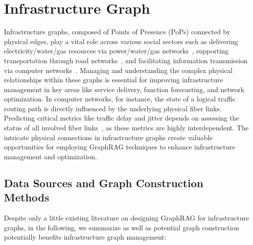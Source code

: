 \newpage
\section{Infrastructure Graph \emojiinfratitle}\label{sec-infra}


Infrastructure graphs, composed of Points of Presence (PoPs) connected by physical edges, play a vital role across various social sectors such as delivering electricity/water/gas resources via power/water/gas networks~\cite{xing2022graph, yang2023graph, liao2021review}, supporting transportation through road networks~\cite{wang2020traffic, jiang2022graph}, and facilitating information transmission via computer networks~\cite{rusek2020routenet, zhang2023tfe}. Managing and understanding the complex physical relationships within these graphs is essential for improving infrastructure management in key areas like service delivery, function forecasting, and network optimization. In computer networks, for instance, the state of a logical traffic routing path is directly influenced by the underlying physical fiber links. Predicting critical metrics like traffic delay and jitter depends on assessing the status of all involved fiber links~\cite{ferriol2023routenet, rusek2020routenet}, as these metrics are highly interdependent. The intricate physical connections in infrastructure graphs create valuable opportunities for employing GraphRAG techniques to enhance infrastructure management and optimization.


\subsection{Data Sources and Graph Construction Methods}
Despite only a little existing literature on designing GraphRAG for infrastructure graphs, in the following, we summarize as well as potential graph construction potentially benefits infrastructure graph management:

